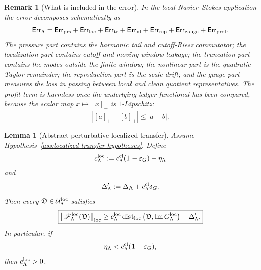 \documentclass[11pt]{article}
\numberwithin{equation}{section}
\newtheorem{lemma}[theorem]{Lemma}
\newtheorem{remark}[theorem]{Remark}
\newcommand{\eps}{\varepsilon}
\newcommand{\Err}{\mathsf{Err}}
\newcommand{\Image}{\operatorname{Im}}
\newcommand{\Dist}{\operatorname{dist}}
\begin{document}
\begin{remark}[What is included in the error]\label{rem:localized-error-components}
In the local Navier--Stokes application the error decomposes schematically as
\[
        \Err_\Lambda
        =
        \Err_{\rm prs}
        +
        \Err_{\rm loc}
        +
        \Err_{\rm tr}
        +
        \Err_{\rm nl}
        +
        \Err_{\rm rep}
        +
        \Err_{\rm gauge}
        +
        \Err_{\rm prof}.
\]
The pressure part contains the harmonic tail and cutoff-Riesz commutator;
the localization part contains cutoff and moving-window leakage; the
truncation part contains the modes outside the finite window; the nonlinear
part is the quadratic Taylor remainder; the reproduction part is the scale
drift; and the gauge part measures the loss in passing between local and
clean quotient representatives.  The profit term is harmless once the
underlying ledger functional has been compared, because the scalar map
\(x\mapsto [x]_+\) is \(1\)-Lipschitz:
\[
        \left|[a]_+-[b]_+\right|
        \le |a-b|.
\]
\end{remark}

\begin{lemma}[Abstract perturbative localized transfer]\label{lem:abstract-localized-transfer}
Assume Hypothesis~\ref{ass:localized-transfer-hypotheses}.  Define
\[
        c_\Lambda^{\rm loc}
        :=
        c_\Lambda^{\rm cl}(1-\eps_G)-\eta_\Lambda
\]
and
\[
        \Delta_\Lambda'
        :=
        \Delta_\Lambda+c_\Lambda^{\rm cl}\delta_G .
\]
Then every
\(\mathfrak D\in\mathcal U_\Lambda^{\rm loc}\) satisfies
\[
\boxed{
        \left\|
        \mathscr F_\Lambda^{\rm loc}(\mathfrak D)
        \right\|_{\rm loc}
        \ge
        c_\Lambda^{\rm loc}
        \Dist_{\rm loc}
        \left(
        \mathfrak D,
        \Image G_\Lambda^{\rm loc}
        \right)
        -
        \Delta_\Lambda' .
}
\]
In particular, if
\[
        \eta_\Lambda
        <
        c_\Lambda^{\rm cl}(1-\eps_G),
\]
then \(c_\Lambda^{\rm loc}>0\).
\end{lemma}
\end{document}
